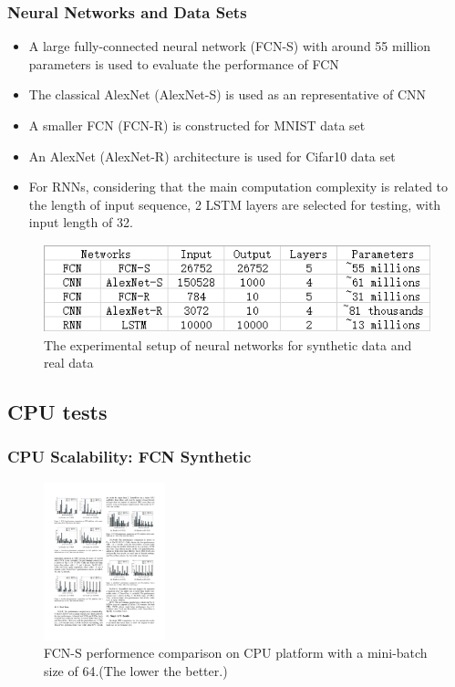 
\begin{frame}
  \MyLogo
  \frametitle{Neural Networks and Data Sets}  

\medskip

\begin{itemize}

\item A large fully-connected neural network (\alert{FCN-S}) with around 55 million parameters is used to evaluate the performance of FCN

\item The classical AlexNet (\alert{AlexNet-S}) is used as an representative of CNN

\item A smaller FCN (\alert{FCN-R}) is constructed for MNIST data set

\item An AlexNet (\alert{AlexNet-R}) architecture is used for Cifar10 data set

\item For RNNs, considering that the main computation complexity is related to the length of input sequence, 2 LSTM layers are selected for testing, with input length of 32.

\end{itemize}

\begin{figure}[htbp] 
\includegraphics[height=1in]{figures/models.png} 
\caption{The experimental setup of neural networks for synthetic data and real data}
\end{figure}
	
\end{frame}

\subsection{CPU tests}

\begin{frame}
	\MyLogo
	\frametitle{CPU Scalability: FCN Synthetic}  
	\begin{figure}[htbp] 
		\includegraphics[height=1.8in]{figures/FCN-S1.pdf} 
		\caption{FCN-S performence comparison on CPU platform with a mini-batch size of 64.(The lower the better.)}
	\end{figure}
\end{frame}

